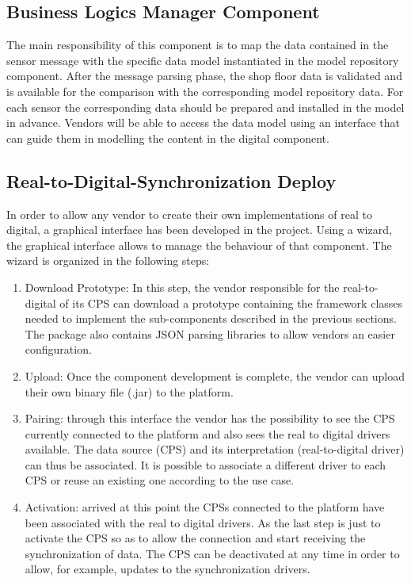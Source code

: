\subsection{Business Logics Manager Component}
The main responsibility of this component is to map the data contained in the sensor message with the specific data model instantiated in the model repository component.
After the message parsing phase, the shop floor data is validated and is available for the comparison with the corresponding model repository data. For each sensor the corresponding data should be prepared and installed in the model in advance. Vendors will be able to access the data model using an interface that can guide them in modelling the content in the digital component.

\subsection{Real-to-Digital-Synchronization Deploy}
In order to allow any vendor to create their own implementations of real to digital, a graphical interface has been developed in the project. Using a wizard, the graphical interface allows to manage the behaviour of that component. 
The wizard is organized in the following steps:
\begin{enumerate}
\item Download Prototype: In this step, the vendor responsible for the real-to-digital of its CPS can download a prototype containing the framework classes needed to implement the sub-components described in the previous sections. The package also contains JSON parsing libraries to allow vendors an easier configuration.
\item Upload: Once the component development is complete, the vendor can upload their own binary file (.jar) to the platform.
\item Pairing: through this interface the vendor has the possibility to see the CPS currently connected to the platform and also sees the real to digital drivers available. The data source (CPS) and its interpretation (real-to-digital driver) can thus be associated. It is possible to associate a different driver to each CPS or reuse an existing one according to the use case.
\item Activation: arrived at this point the CPSs connected to the platform have been associated with the real to digital drivers. As the last step is just to activate the CPS so as to allow the connection and start receiving the synchronization of data. The CPS can be deactivated at any time in order to allow, for example, updates to the synchronization drivers.
\end{enumerate}

